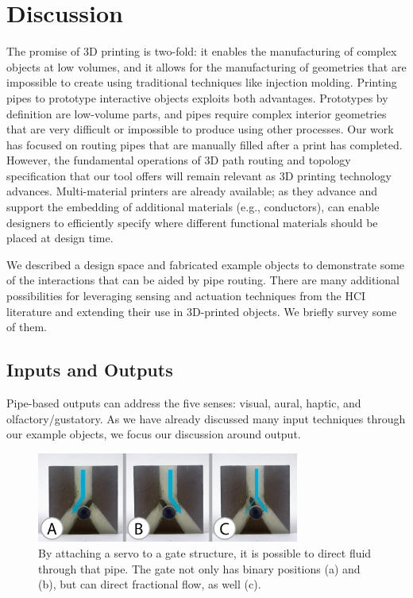 \section{Discussion}

The promise of 3D printing is two-fold: it enables the manufacturing of complex objects at low volumes, and it allows for the manufacturing of geometries that are impossible to create using traditional techniques like injection molding.  Printing pipes to prototype interactive objects exploits both advantages. Prototypes by definition are low-volume parts, and pipes require complex interior geometries that are very difficult or impossible to produce using other processes. Our work has focused on routing pipes that are manually filled after a print has completed. However, the fundamental operations of 3D path routing and topology specification that our tool offers will remain relevant as 3D printing technology advances. Multi-material printers are already available; as they advance and support the embedding of additional materials (e.g., conductors), \systemname can enable designers to efficiently specify where different functional materials should be placed at design time.

We described a design space and fabricated example objects to demonstrate some of the interactions that can be aided by pipe routing. There are many additional possibilities for leveraging sensing and actuation techniques from the HCI literature and extending their use in 3D-printed objects. We briefly survey some of them.

\subsection{Inputs and Outputs}

Pipe-based outputs can address the five senses: visual, aural, haptic, and olfactory/gustatory.  As we have already discussed many input techniques through our example objects, we focus our discussion around output.  %

\begin{figure}[h]
\centering
    \includegraphics[width=3.4in]{figures/gates.png}
\caption{By attaching a servo to a gate structure, it is possible to direct fluid through that pipe.  The gate not only has binary positions (a) and (b), but can direct fractional flow, as well (c).}
\label{fig:direct}
\end{figure}

